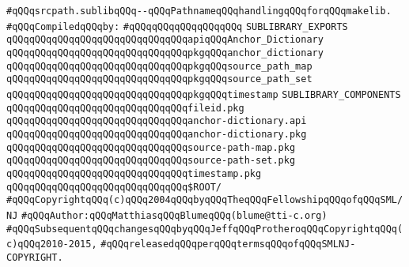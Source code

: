 \label{src/app/makelib/paths/srcpath.sublib}
\verb|#qQQqsrcpath.sublibqQQq--qQQqPathnameqQQqhandlingqQQqforqQQqmakelib.|\newline
\newline
\verb|#qQQqCompiledqQQqby:|\newline
\verb|#qQQqqQQqqQQqqQQqqQQq|\newline
\newline
\verb|SUBLIBRARY_EXPORTS|\newline
\newline
\verb|qQQqqQQqqQQqqQQqqQQqqQQqqQQqqQQqapiqQQqAnchor_Dictionary|\newline
\verb|qQQqqQQqqQQqqQQqqQQqqQQqqQQqqQQqpkgqQQqanchor_dictionary|\newline
\verb|qQQqqQQqqQQqqQQqqQQqqQQqqQQqqQQqpkgqQQqsource_path_map|\newline
\verb|qQQqqQQqqQQqqQQqqQQqqQQqqQQqqQQqpkgqQQqsource_path_set|\newline
\verb|qQQqqQQqqQQqqQQqqQQqqQQqqQQqqQQqpkgqQQqtimestamp|\newline
\newline
\newline
\verb|SUBLIBRARY_COMPONENTS|\newline
\verb|qQQqqQQqqQQqqQQqqQQqqQQqqQQqqQQqfileid.pkg|\newline
\verb|qQQqqQQqqQQqqQQqqQQqqQQqqQQqqQQqanchor-dictionary.api|\newline
\verb|qQQqqQQqqQQqqQQqqQQqqQQqqQQqqQQqanchor-dictionary.pkg|\newline
\verb|qQQqqQQqqQQqqQQqqQQqqQQqqQQqqQQqsource-path-map.pkg|\newline
\verb|qQQqqQQqqQQqqQQqqQQqqQQqqQQqqQQqsource-path-set.pkg|\newline
\verb|qQQqqQQqqQQqqQQqqQQqqQQqqQQqqQQqtimestamp.pkg|\newline
\newline
\verb|qQQqqQQqqQQqqQQqqQQqqQQqqQQqqQQq$ROOT/|\newline
\newline
\newline
\verb|#qQQqCopyrightqQQq(c)qQQq2004qQQqbyqQQqTheqQQqFellowshipqQQqofqQQqSML/NJ|\newline
\verb|#qQQqAuthor:qQQqMatthiasqQQqBlumeqQQq(blume@tti-c.org)|\newline
\verb|#qQQqSubsequentqQQqchangesqQQqbyqQQqJeffqQQqProtheroqQQqCopyrightqQQq(c)qQQq2010-2015,|\newline
\verb|#qQQqreleasedqQQqperqQQqtermsqQQqofqQQqSMLNJ-COPYRIGHT.|\newline

